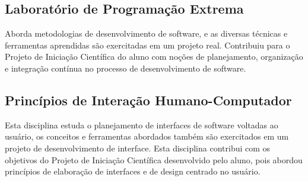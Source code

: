 \documentclass[a4paper, 11pt, twoside]{article}
\begin{document}
\begin{multicols}{2}
\subsection{Laboratório de Programação Extrema}

Aborda metodologias de desenvolvimento de software, e as
diversas técnicas e ferramentas aprendidas são exercitadas em
um projeto real. Contribuiu para o Projeto de Iniciação Científica
do aluno com noções de planejamento, organização e integração contínua
no processo de desenvolvimento de software.

\subsection{Princípios de Interação Humano-Computador}

Esta disciplina estuda o planejamento de interfaces de software voltadas 
ao usuário, os conceitos e ferramentas abordados também são exercitados
em um projeto de desenvolvimento de interface. Esta disciplina contribui com
os objetivos do Projeto de Iniciação Científica desenvolvido pelo aluno,
pois abordou princípios de elaboração de interfaces e de design centrado
no usuário.

\end{multicols}

\newpage


\end{document}
